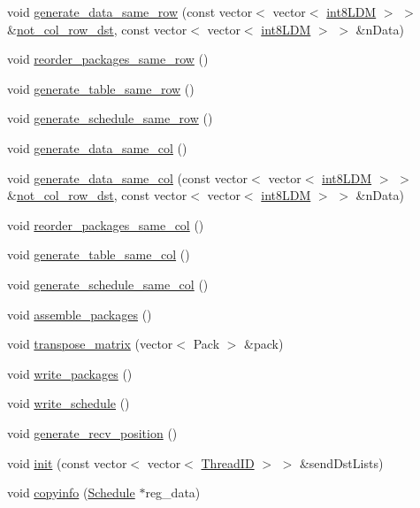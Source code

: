 \begin{DoxyCompactItemize}
\item 
void \hyperlink{classRlmpiInitializer_aad9919df0a82470522b25994dedeaf4e}{generate\_\-data\_\-same\_\-row} (const vector$<$ vector$<$ \hyperlink{RlmpiSharedType_8h_a69782ffde89d45e86308f10afedf08a6}{int8LDM} $>$ $>$ \&\hyperlink{classRlmpiInitializer_a77a01156d9dc0028c4044c23bd28d41c}{not\_\-col\_\-row\_\-dst}, const vector$<$ vector$<$ \hyperlink{RlmpiSharedType_8h_a69782ffde89d45e86308f10afedf08a6}{int8LDM} $>$ $>$ \&nData)
\item 
void \hyperlink{classRlmpiInitializer_a0ff3e38b34bebb951b36107951073c70}{reorder\_\-packages\_\-same\_\-row} ()
\item 
void \hyperlink{classRlmpiInitializer_ad1b5f8433f2f02756f4f522d552b8c0c}{generate\_\-table\_\-same\_\-row} ()
\item 
void \hyperlink{classRlmpiInitializer_a2e01c4b0ff789de3d50df5b7ead1e86d}{generate\_\-schedule\_\-same\_\-row} ()
\item 
void \hyperlink{classRlmpiInitializer_aa88c272b5b57d3ec44bbe183048e89b4}{generate\_\-data\_\-same\_\-col} ()
\item 
void \hyperlink{classRlmpiInitializer_a68f0277b57d6a61af97846cd9e100ddc}{generate\_\-data\_\-same\_\-col} (const vector$<$ vector$<$ \hyperlink{RlmpiSharedType_8h_a69782ffde89d45e86308f10afedf08a6}{int8LDM} $>$ $>$ \&\hyperlink{classRlmpiInitializer_a77a01156d9dc0028c4044c23bd28d41c}{not\_\-col\_\-row\_\-dst}, const vector$<$ vector$<$ \hyperlink{RlmpiSharedType_8h_a69782ffde89d45e86308f10afedf08a6}{int8LDM} $>$ $>$ \&nData)
\item 
void \hyperlink{classRlmpiInitializer_a41a594eb50f4f0e3b44a0a28eb0af396}{reorder\_\-packages\_\-same\_\-col} ()
\item 
void \hyperlink{classRlmpiInitializer_aacafe4bfcbd2d27b6c63904ac431c966}{generate\_\-table\_\-same\_\-col} ()
\item 
void \hyperlink{classRlmpiInitializer_a9ae8fa3507bc5d2bee236e2320ae9ce1}{generate\_\-schedule\_\-same\_\-col} ()
\item 
void \hyperlink{classRlmpiInitializer_a03d8fdd916121bf1e703408abaf00492}{assemble\_\-packages} ()
\item 
void \hyperlink{classRlmpiInitializer_a0c2417a7be3b73b1589778b9dba76143}{transpose\_\-matrix} (vector$<$ Pack $>$ \&pack)
\item 
void \hyperlink{classRlmpiInitializer_a1d5c7addc4a0d39152ac81ebec7726bb}{write\_\-packages} ()
\item 
void \hyperlink{classRlmpiInitializer_a97d48ddb124af75c09509e63cc327246}{write\_\-schedule} ()
\item 
void \hyperlink{classRlmpiInitializer_a6940fb6f728fcdb644d52787082b582f}{generate\_\-recv\_\-position} ()
\item 
void \hyperlink{classRlmpiInitializer_ad2122ed275f1307eae473adbea0d7f1a}{init} (const vector$<$ vector$<$ \hyperlink{RlmpiSharedType_8h_a45297931a529ea634a1b24337a17373f}{ThreadID} $>$ $>$ \&sendDstLists)
\item 
void \hyperlink{classRlmpiInitializer_a81cbb1880215e0efec360a368bc2b3fa}{copyinfo} (\hyperlink{structSchedule}{Schedule} $\ast$reg\_\-data)
\end{DoxyCompactItemize}
